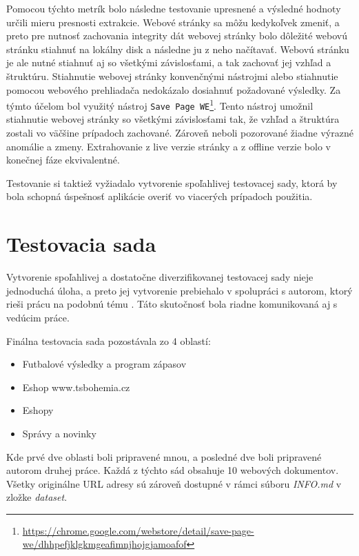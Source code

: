 Pomocou týchto metrík bolo následne testovanie upresnené a výsledné hodnoty určili mieru presnosti extrakcie. Webové stránky sa môžu kedykoľvek zmeniť, a preto pre nutnosť zachovania integrity dát webovej stránky bolo dôležité webovú stránku stiahnuť na lokálny disk a následne ju z neho načítavať. Webovú stránku je ale nutné stiahnuť aj so všetkými závislosťami, a tak zachovať jej vzhľad a štruktúru. Stiahnutie webovej stránky konvenčnými nástrojmi alebo stiahnutie pomocou webového prehliadača nedokázalo dosiahnuť požadované výsledky. Za týmto účelom bol využitý nástroj \texttt{Save Page WE}\footnote{\url{https://chrome.google.com/webstore/detail/save-page-we/dhhpefjklgkmgeafimnjhojgjamoafof}}. Tento nástroj umožnil stiahnutie webovej stránky so všetkými závislosťami tak, že vzhľad a štruktúra zostali vo väčšine prípadoch zachované. Zároveň neboli pozorované žiadne výrazné anomálie a zmeny. Extrahovanie z live verzie stránky a z offline verzie bolo v konečnej fáze ekvivalentné. 

Testovanie si taktiež vyžiadalo vytvorenie spoľahlivej testovacej sady, ktorá by bola schopná úspešnosť aplikácie overiť vo viacerých prípadoch použitia. 

\section{Testovacia sada}
\label{dataset}

Vytvorenie spoľahlivej a dostatočne diverzifikovanej testovacej sady nieje jednoduchá úloha, a preto jej vytvorenie prebiehalo v spolupráci s autorom, ktorý rieši prácu na podobnú tému \cite{mastera}. Táto skutočnosť bola riadne komunikovaná aj s vedúcim práce.

Finálna testovacia sada pozostávala zo 4 oblastí:

\begin{itemize}
    \item Futbalové výsledky a program zápasov
    \item Eshop www.tsbohemia.cz
    \item Eshopy
    \item Správy a novinky
\end{itemize}

Kde prvé dve oblasti boli pripravené mnou, a posledné dve boli pripravené autorom druhej práce. Každá z týchto sád obsahuje 10 webových dokumentov. Všetky originálne URL adresy sú zároveň dostupné v rámci súboru \textit{INFO.md} v zložke \textit{dataset}.


